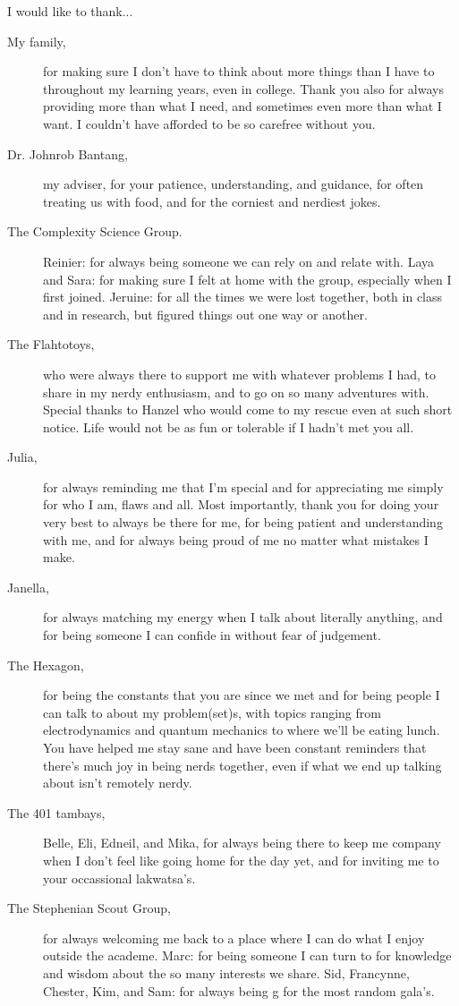 I would like to thank...
\begin{description}
    \item[My family,] for making sure I don't have to think about more things than I have to throughout my learning years, even in college. Thank you also for always providing more than what I need, and sometimes even more than what I want. I couldn't have afforded to be so carefree without you.
    \item[Dr. Johnrob Bantang,] my adviser, for your patience, understanding, and guidance, for often treating us with food, and for the corniest and nerdiest jokes.
    \item[The Complexity Science Group.] Reinier: for always being someone we can rely on and relate with. Laya and Sara: for making sure I felt at home with the group, especially when I first joined. Jeruine: for all the times we were lost together, both in class and in research, but figured things out one way or another.
    \item[The Flahtotoys,] who were always there to support me with whatever problems I had, to share in my nerdy enthusiasm, and to go on so many adventures with. Special thanks to Hanzel who would come to my rescue even at such short notice. Life would not be as fun or tolerable if I hadn't met you all.
    \item[Julia,] for always reminding me that I'm special and for appreciating me simply for who I am, flaws and all. Most importantly, thank you for doing your very best to always be there for me, for being patient and understanding with me, and for always being proud of me no matter what mistakes I make.
    \item[Janella,] for always matching my energy when I talk about literally anything, and for being someone I can confide in without fear of judgement.
    \item[The Hexagon,] for being the constants that you are since we met and for being people I can talk to about my problem(set)s, with topics ranging from electrodynamics and quantum mechanics to where we'll be eating lunch. You have helped me stay sane and have been constant reminders that there's much joy in being nerds together, even if what we end up talking about isn't remotely nerdy.
    \item[The 401 tambays,] Belle, Eli, Edneil, and Mika, for always being there to keep me company when I don't feel like going home for the day yet, and for inviting me to your occassional lakwatsa's.
    \item[The Stephenian Scout Group,] for always welcoming me back to a place where I can do what I enjoy outside the academe. Marc: for being someone I can turn to for knowledge and wisdom about the so many interests we share. Sid, Francynne, Chester, Kim, and Sam: for always being g for the most random gala's.

\end{description}
